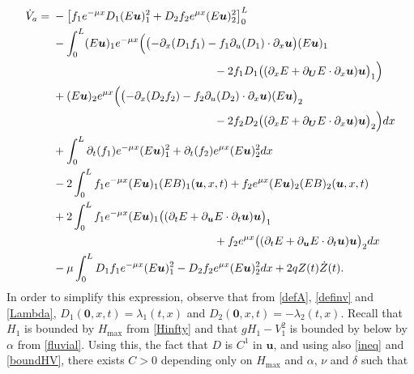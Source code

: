 \begin{align}
\label{diffVa2}
\dot V_{a}={}& -\left[f_{1}e^{-\mu x}D_{1}(E\boldsymbol{u})_{1}^{2}+D_{2}f_{2}e^{\mu x}(E\boldsymbol{u})_{2}^{2}\right]_{0}^{L}\\ \notag
&-\int_{0}^{L}(E\boldsymbol{u})_{1}e^{-\mu x}\Bigl(\bigl(-\partial_{x}(D_{1}f_{1})-f_{1}\partial_{u}(D_{1})\cdot\partial_{x}\boldsymbol{u} \bigr)(E\boldsymbol{u})_{1}\\ \notag
&\hspace*{5cm}-2f_{1}D_{1} \bigl((\partial_{x}E+\partial_{\boldsymbol{U}}E\cdot\partial_{x}\boldsymbol{u})\boldsymbol{u} \bigl)_{1}\Bigr)\\ \notag
&+(E\boldsymbol{u})_{2}e^{\mu x}\Bigl(\bigl(-\partial_{x}(D_{2}f_{2})-f_{2}\partial_{u}(D_{2})\cdot\partial_{x}\boldsymbol{u})(E\boldsymbol{u} \bigr)_{2}\\ \notag
&\hspace*{5cm}-2f_{2}D_{2} \bigl((\partial_{x}E+\partial_{\boldsymbol{U}}E\cdot\partial_{x}\boldsymbol{u})\boldsymbol{u} \bigr)_{2}\Bigr)dx\\ \notag
&+\int_{0}^{L}\partial_{t}(f_{1})e^{-\mu x}(E\boldsymbol{u})_{1}^{2}+\partial_{t}(f_{2})e^{\mu x}(E\boldsymbol{u})_{2}^{2}dx\\ \notag
&-2\int_{0}^{L}f_{1}e^{-\mu x}(E\boldsymbol{u})_{1}(EB)_{1}(\boldsymbol{u},x,t)+f_{2}e^{\mu x}(E\boldsymbol{u})_{2}(EB)_{2}(\boldsymbol{u},x,t)\\ \notag
&+2\int_{0}^{L}f_{1}e^{-\mu x}(E\boldsymbol{u})_{1} \bigl((\partial_{t}E+\partial_{\boldsymbol{u}}E\cdot\partial_{t}\boldsymbol{u})\boldsymbol{u} \bigr)_{1}\\ \notag
&\hspace*{5cm}+f_{2}e^{\mu x} \bigl((\partial_{t}E+\partial_{\boldsymbol{u}}E\cdot\partial_{t}\boldsymbol{u})\boldsymbol{u} \bigr)_{2}dx\\ \notag
&-\mu\int_{0}^{L}D_{1}f_{1}e^{-\mu x}(E\boldsymbol{u})_{1}^{2}-D_{2}f_{2}e^{\mu x}(E\boldsymbol{u})_{2}^{2}dx
+2qZ(t)\dot Z(t).
\end{align}
In order to simplify this expression, observe that from \eqref{defA}, \eqref{definv} and \eqref{Lambda}, $D_{1}(\boldsymbol{0},x,t)=\lambda_{1}(t,x)$ and $D_{2}(\boldsymbol{0},x,t)=-\lambda_{2}(t,x)$. Recall that $H_{1}$ is bounded by $H_{\max}$ from \eqref{Hinfty} and that $gH_{1}-V_{1}^{2}$ is bounded by below by $\alpha$ from \eqref{fluvial}. Using this, the fact that
$D$ is $C^{1}$ in $\boldsymbol{u}$,
and using also \eqref{ineq} and \eqref{boundHV}, there exists $C>0$ depending only on $H_{\max}$ and $\alpha$, $\nu$ and $\delta$ such that
